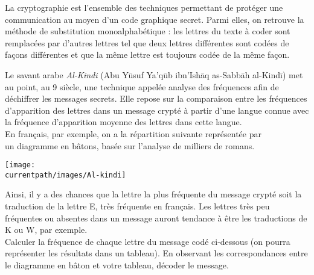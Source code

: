 \begin{enigme}[Cryptographie]
   La cryptographie est l'ensemble des techniques permettant de protéger une communication au moyen d'un code graphique secret. Parmi elles, on retrouve la méthode de substitution monoalphabétique : les lettres du texte à coder sont remplacées par d’autres lettres tel que  deux lettres différentes sont codées de façons différentes et que la même lettre est toujours codée de la même façon. \\
   \begin{minipage}{12cm}
      Le savant arabe {\it Al-Kindi}  (Abu Yūsuf Ya'qūb ibn'Ishāq as-Sabbāh al-Kindī) met au point, au 9 siècle, une technique appelée analyse des fréquences afin de déchiffrer les messages secrets. Elle repose sur la comparaison entre les fréquences d'apparition des lettres dans un message crypté à partir d'une langue connue avec la fréquence d'apparition moyenne des lettres dans cette langue. \\ [3mm]
      En français, par exemple, on a la répartition suivante représentée par \\
      un diagramme en bâtons, basée sur l'analyse de milliers de romans. 
   \end{minipage}
   \qquad
   \begin{minipage}{4cm}
      \texttt{[image: \\currentpath/images/Al-kindi]}
   \end{minipage}
   \begin{center}
      {\footnotesize
   
      }
   \end{center}  
   Ainsi, il y a des chances que la lettre la plus fréquente du message crypté soit la traduction de la lettre E, très fréquente en français. Les lettres très peu fréquentes ou absentes dans un message auront tendance à être les traductions de K ou W, par exemple. \\

   Calculer la fréquence de chaque lettre du message codé ci-dessous (on pourra représenter les résultats dans un tableau). En observant les correspondances entre le diagramme en bâton et votre tableau, décoder le message.
   

\end{enigme}
